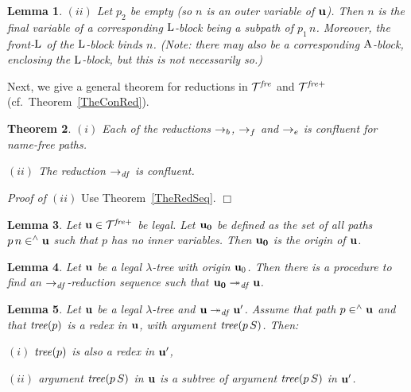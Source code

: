 \documentclass{article}
\theoremstyle{plain}
\newtheorem{The}{Theorem}[section]
\newtheorem{Lem}[The]{Lemma}
\theoremstyle{definition}
\newtheorem{Def}[The]{Definition}
\begin{document}
{\begin{Lem}
$(ii)$ Let $p_2$ be empty (so $n$ is an {\em outer\/} variable of ${\bf u}$). Then $n$ is the final variable of a corresponding ${\rm L}$-block being a subpath of $p_1 \, n$. Moreover, the front-${\rm L}$ of the ${\rm L}$-block binds $n$. (Note: there may also be a corresponding ${\rm A}$-block, enclosing the ${\rm L}$-block, but this is not necessarily so.)
\end{Lem}

Next, we give a general theorem for reductions in ${\cal T}^{\it fre}$ and ${\cal T}^{\it fre+}$ (cf.\ Theorem~\ref{TheConRed}).

\begin{The}\label{TheConNamFre}
$(i)$ Each of the reductions $\rightarrow_b$, $\rightarrow_f$ and $\rightarrow_e$ is confluent for name-free paths.

$(ii)$ The reduction $\rightarrow_{\it df}$ is confluent.
\end{The}

{\it Proof of $(ii)$\/} Use Theorem~\ref{TheRedSeq}. $\Box$

\medskip


\begin{Lem}
Let ${\bf u} \in {\cal T}^{\it fre+}$ be legal. Let ${\bf u_0}$ be defined as the set of all paths $p \, n \in^\wedge {\bf u}$ such that $p$ has no inner variables. Then ${\bf u_0}$ is the origin of ${\bf u}$.
\end{Lem}


\begin{Lem}
Let ${\bf u}$ be a legal $\lambda$-tree with origin ${\bf u}_0$. Then there is a procedure to find an $\rightarrow_{\it df}$-reduction sequence such that ${\bf u_0} \twoheadrightarrow_{\it df} {\bf u}$.
\end{Lem}

\begin{Lem}\label{LemDelRed}
Let ${\bf u}$ be a legal $\lambda$-tree and ${\bf u} \twoheadrightarrow_{\it df} {\bf u}'$. Assume that path $p \in^\wedge {\bf u}$ and that ${\it tree}(p)$ is a redex in ${\bf u}$, with argument ${\it tree}(p \, S)$. Then:

$(i)$ ${\it tree}(p)$ is also a redex in ${\bf u}'$,

$(ii)$ argument ${\it tree}(p \, S)$ in ${\bf u}$ is a subtree of argument ${\it tree}(p \, S)$ in ${\bf u}'$.
\end{Lem}




}
\end{document}
